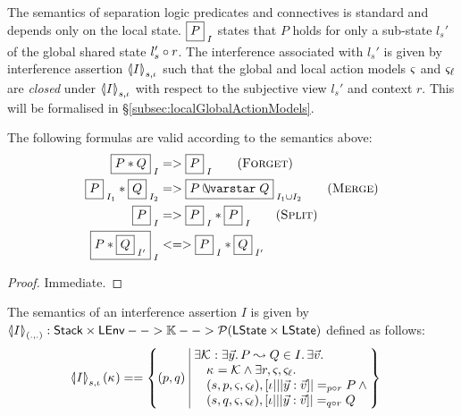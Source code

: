 
The semantics of separation logic predicates and connectives is
standard and depends only on the local state.  $\shared{P}{I}$ states
that $P$ holds for only a sub-state $l_s'$ of the global shared state
$l_s'\composeL r$. The interference associated with $l_s'$ is given by
interference assertion $\semI[s,\lenv]{I}$ such that the global and
local action models $\amod{}$ and $\amod{\ell}$ are \emph{closed}
under $\semI[s,\lenv]{I}$ with respect to the subjective view $l_s'$ and
context $r$. This will be formalised in \S\ref{subsec:localGlobalActionModels}.

\begin{lemma}
  \label{lem:assertionFacts}
  The following formulas are valid according to the semantics above:
  \begin{align*}
  \shared{P * Q}{I} &=> \shared{P}{I}  \tag{\textsc{Forget}}\\
  \shared{P}{I_1} * \shared{Q}{I_2} &=> \shared{P \sepish Q}{I_1 \cup I_2} \tag{\textsc{Merge}}\\
  \shared{P}{I} &=> \shared{P}{I} * \shared P I \tag{\textsc{Split}}\\
  \shared{P * \shared{Q}{I'}}{I} &<=> \shared{P}{I} * \shared{Q}{I'}
  \end{align*}
\end{lemma}
\begin{proof}
  Immediate.
\end{proof}


\begin{definition}
  \label{def:interferenceSemantics}
  The semantics of an interference assertion $I$ is given by
  $
  \semI[(.,.)]{I} : \set{Stack}\times\LEnv -->
  \Caps -->  \powerset(\LStates \times \LStates)
  $
  defined as follows:
  \begin{align*}
  \semI[s,\lenv]{I}(\ca{}) &==
  \left\{
  \begin{array}{@{}l@{\ }|@{\ }r@{}}
    (p, q)&
    \begin{array}{@{}l@{}}
      \exsts{\interAss{\capAss{}}{\vec{y}}{P}{Q} \in I} \exsts{\vec{v}}\null\\
      \quad\ca{} = \capAss{} \land\exsts{r, \amod{}, \amod{\ell}}\\
      \quad (s,p,\amod{}, \amod{\ell}),[\lenv|||\vec y:\vec v] |=_{p \composeL r} P \land\null\\
      \quad (s,q,\amod{}, \amod{\ell}),[\lenv|||\vec y:\vec v] |=_{q \composeL r} Q
    \end{array}
  \end{array}
  \right\}
  \end{align*}
\end{definition}



